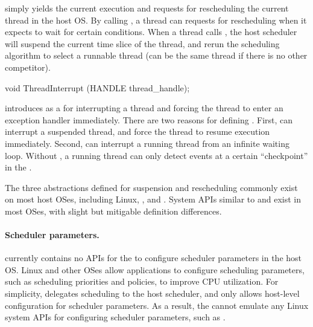  simply yields the current execution and requests for rescheduling the current thread in the host OS.
By calling , a thread can requests for rescheduling when it expects
to wait for certain conditions.
When a thread calls , the host scheduler will suspend the current time slice of the thread,
and rerun the scheduling algorithm
to select a runnable thread (can be the same thread if there is no other competitor).



\begin{paldef}
void ThreadInterrupt (HANDLE thread_handle);
\end{paldef}



\graphene{} introduces
 as a \hostapi{} for interrupting a thread and forcing the thread to enter an exception handler immediately.
There are two reasons for defining .
First,  can interrupt a suspended thread, and force the thread to resume execution immediately.
Second,  can interrupt a running thread from an infinite waiting loop.
Without ,
a running thread can only detect events at a certain ``checkpoint'' in the \libos{}.


The three abstractions defined for suspension and rescheduling
commonly exist on most host OSes, including Linux, \win{}, and \osx{}.
System APIs similar to
 and 
exist in most OSes,
with slight but mitigable definition differences.







\paragraph{Scheduler parameters.}
\Thehostabi{} currently contains no APIs for the \libos{} to configure scheduler parameters in the host OS.
Linux and other OSes allow applications to configure scheduling parameters,
such as scheduling priorities and policies,
to improve CPU utilization.
For simplicity,
\thehostabi{} delegates scheduling to the host scheduler,
and only allows host-level configuration for scheduler parameters.
As a result, the \libos{} cannot emulate any Linux system APIs for configuring scheduler parameters,
such as .




